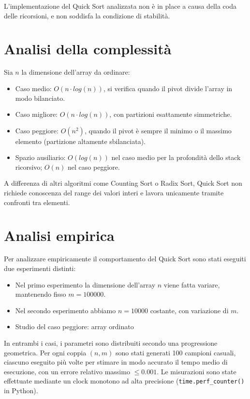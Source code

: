 \documentclass[a4paper, 12pt, oneside]{book}
\begin{document}
\noindent
L'implementazione del Quick Sort analizzata non è in place a causa della coda delle ricorsioni, e non soddisfa la condizione di stabilità.

\section{Analisi della complessità}

Sia \(n\) la dimensione dell'array da ordinare:

\begin{itemize}
    \item Caso medio: \(O(n \cdot log(n))\), si verifica quando il pivot divide l'array in modo bilanciato.
    \item Caso migliore: \(O(n \cdot log(n))\), con partizioni esattamente simmetriche.
    \item Caso peggiore: \(O(n^2)\), quando il pivot è sempre il minimo o il massimo elemento (partizione altamente sbilanciata).
    \item Spazio ausiliario: \(O(log(n))\) nel caso medio per la profondità dello stack ricorsivo; \(O(n)\) nel caso peggiore.
\end{itemize}

\noindent A differenza di altri algoritmi come Counting Sort o Radix Sort, Quick Sort non richiede conoscenza del range dei valori interi e lavora unicamente tramite confronti tra elementi.

\section{Analisi empirica}

Per analizzare empiricamente il comportamento del Quick Sort sono stati eseguiti due esperimenti distinti:

\begin{itemize}
    \item Nel primo esperimento la dimensione dell'array \(n\) viene fatta variare, mantenendo fisso \(m = 100000\).
    \item Nel secondo esperimento abbiamo \(n = 10000\) costante, con variazione di \(m\).
    \item Studio del caso peggiore: array ordinato
\end{itemize}

\noindent In entrambi i casi, i parametri sono distribuiti secondo una progressione geometrica.
Per ogni coppia \((n, m)\) sono stati generati 100 campioni casuali, ciascuno eseguito più volte per stimare in modo accurato il tempo medio di esecuzione, con un errore relativo massimo \(\leq 0.001\).
Le misurazioni sono state effettuate mediante un clock monotono ad alta precisione (\texttt{time.perf\_counter()} in Python). \\
\end{document}
